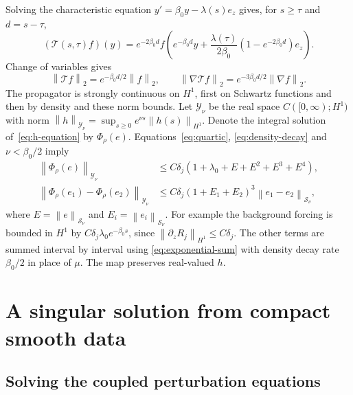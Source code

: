 \documentclass[11pt]{article}
\numberwithin{equation}{section}
\theoremstyle{remark}
\newcommand{\norm}[1]{\left\|#1\right\|}
\begin{document}
Solving the characteristic equation $y'=\beta_0y-\lambda(s)e_z$ gives,
for $s\ge\tau$ and $d=s-\tau$,
\begin{equation}\label{eq:density-flow}
 (\mathcal T(s,\tau)f)(y)=e^{-2\beta_0d}
  f\left(e^{-\beta_0d}y+
       \frac{\lambda(\tau)}{2\beta_0}(1-e^{-2\beta_0d})e_z\right).
\end{equation}
Change of variables gives
\begin{equation}\label{eq:density-decay}
 \norm{\mathcal Tf}_2=e^{-\beta_0d/2}\norm f_2,
 \qquad
 \norm{\nabla\mathcal Tf}_2=e^{-3\beta_0d/2}\norm{\nabla f}_2.
\end{equation}
The propagator is strongly continuous on $H^1$, first on Schwartz
functions and then by density and these norm bounds.
Let $\mathcal Y_\nu$ be the real space $C([0,\infty);H^1)$ with norm
$\norm h_{\mathcal Y_\nu}=\sup_{s\ge0}e^{\nu s}\norm{h(s)}_{H^1}$.
Denote the integral solution of~\eqref{eq:h-equation} by $\Phi_\rho(e)$.
Equations~\eqref{eq:quartic}, \eqref{eq:density-decay} and
$\nu<\beta_0/2$ imply
\begin{align}
 \norm{\Phi_\rho(e)}_{\mathcal Y_\nu}
 &\le C\delta_j(1+\lambda_0+E+E^2+E^3+E^4),\label{eq:rho-map}\\
 \norm{\Phi_\rho(e_1)-\Phi_\rho(e_2)}_{\mathcal Y_\nu}
 &\le C\delta_j(1+E_1+E_2)^3\norm{e_1-e_2}_{\mathcal S_\nu},
 \label{eq:rho-map-difference}
\end{align}
where $E=\norm e_{\mathcal S_\nu}$ and $E_i=\norm{e_i}_{\mathcal S_\nu}$.
For example the background forcing is bounded in $H^1$ by
$C\delta_j\lambda_0e^{-\beta_0s}$, since
$\norm{\partial_zR_j}_{H^1}\le C\delta_j$.
The other terms are summed interval by interval using
\eqref{eq:exponential-sum} with density decay rate $\beta_0/2$ in place
of $\mu$. The map preserves real-valued $h$.
\section{A singular solution from compact smooth data}\label{sec:construction}

\subsection{Solving the coupled perturbation equations}
\end{document}
